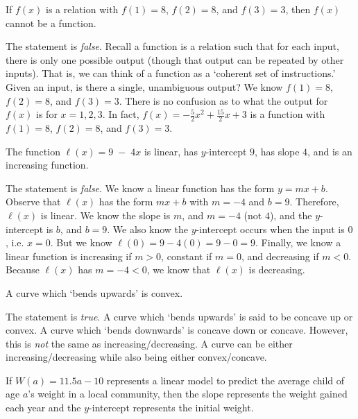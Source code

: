 \documentclass[11pt,letterpaper]{article}
\begin{document}
\thispagestyle{title}

 If $f(x)$ is a relation with $f(1)= 8$, $f(2)= 8$, and $f(3)= 3$, then $f(x)$ cannot be a function. \pspace

\sol The statement is \textit{false}. Recall a function is a relation such that for each input, there is only one possible output (though that output can be repeated by other inputs). That is, we can think of a function as a `coherent set of instructions.' Given an input, is there a single, unambiguous output? We know $f(1)= 8$, $f(2)= 8$, and $f(3)= 3$. There is no confusion as to what the output for $f(x)$ is for $x= 1, 2, 3$. In fact, $f(x)= -\tfrac{5}{2} x^2 + \tfrac{15}{2} x + 3$ is a function with $f(1)= 8$, $f(2)= 8$, and $f(3)= 3$. \par\vspace{1.3cm}



 The function $\ell(x)= 9 \;-\; 4x$ is linear, has $y$-intercept $9$, has slope $4$, and is an increasing function. \pspace

\sol The statement is \textit{false}. We know a linear function has the form $y= mx + b$. Observe that $\ell(x)$ has the form $mx + b$ with $m= -4$ and $b= 9$. Therefore, $\ell(x)$ is linear. We know the slope is $m$, and $m= -4$ (not $4$), and the $y$-intercept is $b$, and $b= 9$. We also know the $y$-intercept occurs when the input is $0$, i.e. $x= 0$. But we know $\ell(0)= 9 - 4(0)= 9 - 0= 9$. Finally, we know a linear function is increasing if $m > 0$, constant if $m= 0$, and decreasing if $m < 0$. Because $\ell(x)$ has $m= -4 < 0$, we know that $\ell(x)$ is decreasing. \par\vspace{1.3cm}



 A curve which `bends upwards' is convex. \pspace

\sol The statement is \textit{true}. A curve which `bends upwards' is said to be concave up or convex. A curve which `bends downwards' is concave down or concave. However, this is \textit{not} the same as increasing/decreasing. A curve can be either increasing/decreasing while also being either convex/concave. \par\vspace{1.3cm}



 If $W(a)= 11.5a - 10$ represents a linear model to predict the average child of age $a$'s weight in a local community, then the slope represents the weight gained each year and the $y$-intercept represents the initial weight. \pspace
\end{document}
